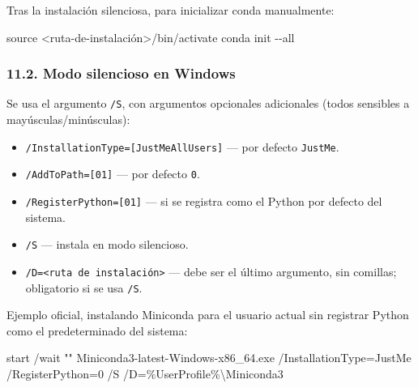 \documentclass[
  doc,
  floatsintext,
  longtable,
  a4paper,
  nolmodern,
  notxfonts,
  notimes,
  12pt,
  colorlinks=true,linkcolor=blue,citecolor=blue,urlcolor=blue]{apa7}
\newenvironment{Shaded}{\begin{snugshade}}{\end{snugshade}}
\newcommand{\AttributeTok}[1]{\textcolor[rgb]{0.40,0.45,0.13}{#1}}
\newcommand{\BuiltInTok}[1]{\textcolor[rgb]{0.00,0.23,0.31}{#1}}
\newcommand{\ExtensionTok}[1]{\textcolor[rgb]{0.00,0.23,0.31}{#1}}
\newcommand{\NormalTok}[1]{\textcolor[rgb]{0.00,0.23,0.31}{#1}}
\newcommand{\OperatorTok}[1]{\textcolor[rgb]{0.37,0.37,0.37}{#1}}
\newcommand{\PreprocessorTok}[1]{\textcolor[rgb]{0.68,0.00,0.00}{#1}}
\newcommand{\StringTok}[1]{\textcolor[rgb]{0.13,0.47,0.30}{#1}}
\newcommand{\VariableTok}[1]{\textcolor[rgb]{0.07,0.07,0.07}{#1}}
\providecommand{\tightlist}{%
  \setlength{\itemsep}{0pt}\setlength{\parskip}{0pt}}
\begin{document}
Tras la instalación silenciosa, para inicializar conda manualmente:

\begin{Shaded}
\begin{Highlighting}[]
\BuiltInTok{source} \OperatorTok{\textless{}}\NormalTok{ruta{-}de{-}instalación}\OperatorTok{\textgreater{}}\NormalTok{/bin/activate}
\ExtensionTok{conda}\NormalTok{ init }\AttributeTok{{-}{-}all}
\end{Highlighting}
\end{Shaded}

\subsubsection{11.2. Modo silencioso en
Windows}\label{modo-silencioso-en-windows}

Se usa el argumento \texttt{/S}, con argumentos opcionales adicionales
(todos sensibles a mayúsculas/minúsculas):

\begin{itemize}
\tightlist
\item
  \texttt{/InstallationType={[}JustMe\textbar{}AllUsers{]}} --- por
  defecto \texttt{JustMe}.
\item
  \texttt{/AddToPath={[}0\textbar{}1{]}} --- por defecto \texttt{0}.
\item
  \texttt{/RegisterPython={[}0\textbar{}1{]}} --- si se registra como el
  Python por defecto del sistema.
\item
  \texttt{/S} --- instala en modo silencioso.
\item
  \texttt{/D=\textless{}ruta\ de\ instalación\textgreater{}} --- debe
  ser el último argumento, sin comillas; obligatorio si se usa
  \texttt{/S}.
\end{itemize}

Ejemplo oficial, instalando Miniconda para el usuario actual sin
registrar Python como el predeterminado del sistema:

\begin{Shaded}
\begin{Highlighting}[]
\BuiltInTok{start} \AttributeTok{/wait} \StringTok{""}\NormalTok{ Miniconda3}\AttributeTok{{-}latest{-}Windows{-}x86\_64}\NormalTok{.exe }\AttributeTok{/InstallationType}\NormalTok{=JustMe }\AttributeTok{/RegisterPython}\NormalTok{=0 }\AttributeTok{/S} \AttributeTok{/D}\NormalTok{=}\PreprocessorTok{\%}\VariableTok{UserProfile}\PreprocessorTok{\%}\NormalTok{\textbackslash{}Miniconda3}
\end{Highlighting}
\end{Shaded}
\end{document}
